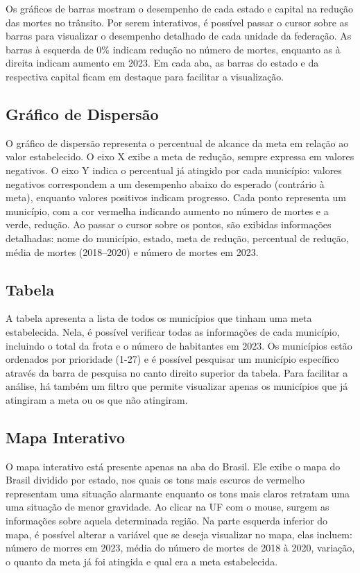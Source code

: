 \documentclass[
  letterpaper,
  DIV=11,
  numbers=noendperiod]{scrreprt}
\begin{document}
Os gráficos de barras mostram o desempenho de cada estado e capital na
redução das mortes no trânsito. Por serem interativos, é possível passar
o cursor sobre as barras para visualizar o desempenho detalhado de cada
unidade da federação. As barras à esquerda de 0\% indicam redução no
número de mortes, enquanto as à direita indicam aumento em 2023. Em cada
aba, as barras do estado e da respectiva capital ficam em destaque para
facilitar a visualização.

\subsection{Gráfico de Dispersão}\label{gruxe1fico-de-dispersuxe3o}

O gráfico de dispersão representa o percentual de alcance da meta em
relação ao valor estabelecido. O eixo X exibe a meta de redução, sempre
expressa em valores negativos. O eixo Y indica o percentual já atingido
por cada município: valores negativos correspondem a um desempenho
abaixo do esperado (contrário à meta), enquanto valores positivos
indicam progresso. Cada ponto representa um município, com a cor
vermelha indicando aumento no número de mortes e a verde, redução. Ao
passar o cursor sobre os pontos, são exibidas informações detalhadas:
nome do município, estado, meta de redução, percentual de redução, média
de mortes (2018--2020) e número de mortes em 2023.

\subsection{Tabela}\label{tabela}

A tabela apresenta a lista de todos os municípios que tinham uma meta
estabelecida. Nela, é possível verificar todas as informações de cada
município, incluindo o total da frota e o número de habitantes em 2023.
Os municípios estão ordenados por prioridade (1-27) e é possível
pesquisar um município específico através da barra de pesquisa no canto
direito superior da tabela. Para facilitar a análise, há também um
filtro que permite visualizar apenas os municípios que já atingiram a
meta ou os que não atingiram.

\subsection{Mapa Interativo}\label{mapa-interativo}

O mapa interativo está presente apenas na aba do Brasil. Ele exibe o
mapa do Brasil dividido por estado, nos quais os tons mais escuros de
vermelho representam uma situação alarmante enquanto os tons mais claros
retratam uma uma situação de menor gravidade. Ao clicar na UF com o
mouse, surgem as informações sobre aquela determinada região. Na parte
esquerda inferior do mapa, é possível alterar a variável que se deseja
visualizar no mapa, elas incluem: número de morres em 2023, média do
número de mortes de 2018 à 2020, variação, o quanto da meta já foi
atingida e qual era a meta estabelecida.
\end{document}
